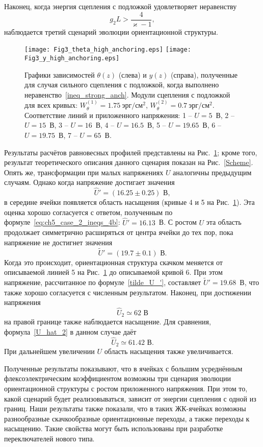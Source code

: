 Наконец, когда энергия сцепления с подложкой удовлетворяет неравенству
\begin{equation}\label{ineq_strong_anch}
	g_2L > \frac{4}{\varkappa - 1},
\end{equation}
наблюдается третий сценарий эволюции ориентационной структуры.
\begin{figure}[ht]
	\texttt{[image: Fig3\_theta\_high\_anchoring.eps]}\hspace{2pc}%
	\texttt{[image: Fig3\_y\_high\_anchoring.eps]}
	\caption{Графики зависимостей $\theta(z)$ (слева) и $y(z)$ (справа), полученные для случая сильного сцепления с подложкой, когда выполнено неравенство~\eqref{ineq_strong_anch}.
		Модули сцепления с подложкой для всех кривых: $W_\theta^{(1)}=1.75\ \text{эрг}/\text{см}^2$, $W_\theta^{(2)} = 0.7\ \text{эрг}/\text{см}^2$.
		Соответствие линий и приложенного напряжения: 1 -- $U = 5$~В, 2 -- $U = 15$~В, 3 -- $U = 16$~В, 4 -- $U = 16.5$~В, 5 -- $U = 19.65$~В, 6 -- $U = 19.75$~В, 7 -- $U = 65$~В.}\label{ch5:fig3}
\end{figure}
Результаты расчётов равновесных профилей представлены на Рис.~\ref{ch5:fig3}; кроме того, результат теоретического описания данного сценария показан на Рис.~\ref{Scheme}.
Опять же, трансформации при малых напряжениях $U$ аналогичны предыдущим случаям.
Однако когда напряжение достигает значения
\begin{equation}
	\hat{U}' = (16.25 \pm 0.25)\text{~В},
\end{equation} 
в середине ячейки появляется область насыщения (кривые 4 и 5 на Рис.~\ref{ch5:fig3}).
Эта оценка хорошо согласуется с ответом, полученным по формуле~\eqref{eq:ch5_case_2_ineqs_4b}: $\hat{U}' = 16.13$~В.
С ростом $U$ эта область продолжает симметрично расширяться от центра ячейки до тех пор, пока напряжение не достигнет значения
\begin{equation}
	\tilde{U}' = (19.7 \pm 0.1)\text{~В}.
\end{equation}
Когда это происходит, ориентационная структура скачком меняется от описываемой линией 5 на Рис.~\ref{ch5:fig3} до описываемой кривой 6.
При этом напряжение, рассчитанное по формуле~\eqref{tilde_U_'}, составляет $\tilde{U}' = 19.68$~В, что также хорошо согласуется с численным результатом.
Наконец, при достижении напряжения
\begin{equation}
	\hat{U}_2 \simeq 62\text{~В}
\end{equation}
на правой границе также наблюдается насыщение.
Для сравнения, формула~\eqref{U_hat_2} в данном случае даёт
\begin{equation}
	\hat{U}_2 \simeq 61.42\text{~В}.
\end{equation}
При дальнейшем увеличении $U$ область насыщения также увеличивается.

Полученные результаты показывают, что в ячейках с большим усреднённым флексоэлектрическим коэффициентом возможны три сценария эволюции ориентационной структуры с ростом приложенного напряжения.
При этом то, какой сценарий будет реализовываться, зависит от энергии сцепления с одной из границ.
Наши результаты также показали, что в таких ЖК-ячейках возможны разнообразные скачкообразные ориентационные переходы, а также переходы к насыщению.
Такие свойства могут быть использованы при разработке переключателей нового типа.